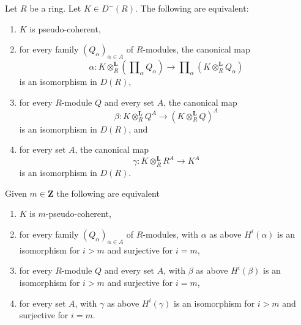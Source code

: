 \begin{lemma}
\label{lemma-pseudo-coherent-tensor}
Let $R$ be a ring. Let $K \in D^-(R)$. The following are equivalent:
\begin{enumerate}
\item $K$ is pseudo-coherent,
\item for every family $(Q_{\alpha})_{\alpha \in A}$ of $R$-modules, the
canonical map
$$
\alpha :
K \otimes_R^\mathbf{L} \left( \prod\nolimits_\alpha Q_{\alpha} \right)
\longrightarrow
\prod\nolimits_\alpha (K \otimes_R^\mathbf{L} Q_{\alpha})
$$
is an isomorphism in $D(R)$,
\item for every $R$-module $Q$ and every set $A$, the canonical map
$$
\beta : K \otimes_R^\mathbf{L} Q^A \longrightarrow (K \otimes_R^\mathbf{L} Q)^A
$$
is an isomorphism in $D(R)$, and
\item for every set $A$, the canonical map
$$
\gamma : K \otimes_R^\mathbf{L} R^A \longrightarrow K^A
$$
is an isomorphism in $D(R)$.
\end{enumerate}
Given $m \in \mathbf{Z}$ the following are equivalent
\begin{enumerate}
\item[(a)] $K$ is $m$-pseudo-coherent,
\item[(b)] for every family $(Q_{\alpha})_{\alpha \in A}$ of $R$-modules,
with $\alpha$ as above
$H^i(\alpha)$ is an isomorphism for $i > m$ and surjective for $i = m$,
\item[(c)] for every $R$-module $Q$ and every set $A$, with $\beta$ as above
$H^i(\beta)$ is an isomorphism for $i > m$ and surjective for $i = m$,
\item[(d)] for every set $A$, with $\gamma$ as above
$H^i(\gamma)$ is an isomorphism for $i > m$ and surjective for $i = m$.
\end{enumerate}
\end{lemma}

